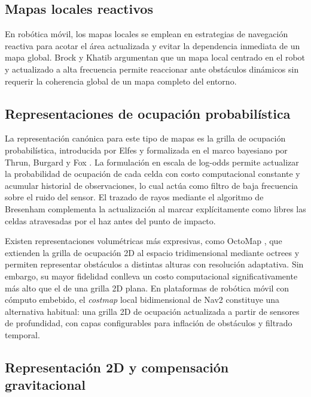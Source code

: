 \subsection{Mapas locales reactivos}
\label{subsec:ea-mapas-reactivos}

En robótica móvil, los mapas locales se emplean en estrategias de navegación reactiva para acotar
el área actualizada y evitar la dependencia inmediata de un mapa global. Brock y Khatib
\cite{brock1999high} argumentan que un mapa local centrado en el robot y actualizado a alta
frecuencia permite reaccionar ante obstáculos dinámicos sin requerir la coherencia global de un
mapa completo del entorno.

\subsection{Representaciones de ocupación probabilística}
\label{subsec:ea-ocupacion}

La representación canónica para este tipo de mapas es la grilla de ocupación probabilística,
introducida por Elfes \cite{Elfes1989} y formalizada en el marco bayesiano por Thrun, Burgard y Fox
\cite{Thrun2005}. La formulación en escala de log-odds permite actualizar la probabilidad de
ocupación de cada celda con costo computacional constante y acumular historial de observaciones, lo
cual actúa como filtro de baja frecuencia sobre el ruido del sensor. El trazado de rayos mediante
el algoritmo de Bresenham \cite{Bresenham1965} complementa la actualización al marcar
explícitamente como libres las celdas atravesadas por el haz antes del punto de impacto.

Existen representaciones volumétricas más expresivas, como OctoMap \cite{hornung2013octomap}, que
extienden la grilla de ocupación 2D al espacio tridimensional mediante octrees y permiten
representar obstáculos a distintas alturas con resolución adaptativa. Sin embargo, su mayor
fidelidad conlleva un costo computacional significativamente más alto que el de una grilla 2D
plana. En plataformas de robótica móvil con cómputo embebido, el \emph{costmap} local bidimensional
de Nav2 \cite{macenski2020nav2} constituye una alternativa habitual: una grilla 2D de ocupación
actualizada a partir de sensores de profundidad, con capas configurables para inflación de
obstáculos y filtrado temporal.

\subsection{Representación 2D y compensación gravitacional}
\label{subsec:ea-2d}

